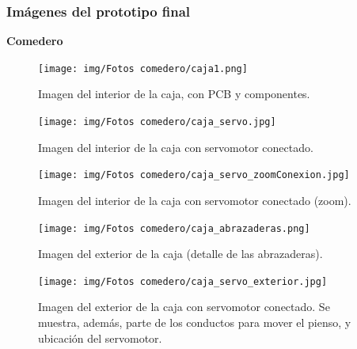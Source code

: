 \documentclass[12pt]{article}
\begin{document}
	\subsubsection{Imágenes del prototipo final}
	\noindent \textbf{Comedero} \\
	
	\begin{figure}[h!]
		\begin{center}
			\texttt{[image: img/Fotos comedero/caja1.png]}
			\caption{Imagen del interior de la caja, con PCB y componentes. }
			\label{Prototipo: caja1}
		\end{center}
	\end{figure}
	
	\pagebreak
	
	\begin{figure}[h!]
		\begin{center}
			\texttt{[image: img/Fotos comedero/caja\_servo.jpg]}
			\caption{Imagen del interior de la caja con servomotor conectado.}
			\label{Prototipo: caja con servo}
		\end{center}
	\end{figure}

	\pagebreak

	\begin{figure}[h!]
		\begin{center}
			\texttt{[image: img/Fotos comedero/caja\_servo\_zoomConexion.jpg]}
			\caption{Imagen del interior de la caja con servomotor conectado (zoom).}
			\label{Prototipo: caja con servo (zoom)}
		\end{center}
	\end{figure}
	
	\pagebreak

	\begin{figure}[h!]
		\begin{center}
			\texttt{[image: img/Fotos comedero/caja\_abrazaderas.png]}
			\caption{Imagen del exterior de la caja (detalle de las abrazaderas).}
			\label{Prototipo: caja con abrazaderas (detalle)}
		\end{center}
	\end{figure}

	\pagebreak
	
	\begin{figure}[h!]
		\begin{center}
			\texttt{[image: img/Fotos comedero/caja\_servo\_exterior.jpg]}
			\caption{Imagen del exterior de la caja con servomotor conectado. Se muestra, además, parte de los conductos para mover el pienso, y ubicación del servomotor.}
			\label{Prototipo: caja con servo (exterior)}
		\end{center}
	\end{figure}
\end{document}
